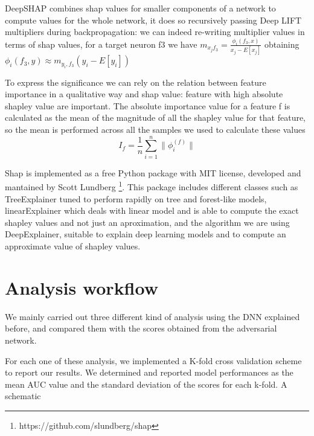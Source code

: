 \documentclass[10pt]{report}
\begin{document}
DeepSHAP combines shap values for smaller components of a network to compute values for the whole network, it does so recursively passing Deep LIFT multipliers during backpropagation: we can indeed re-writing multiplier values in terms of shap values, for a target neuron f3 we have $m_{x_j f_3} = \frac{\phi_i(f_3, x)}{x_j - E[x_j]}$ obtaining $\phi_i(f_3, y) \approx m_{y_i, f_3}(y_i - E[y_i])$


To express the significance we can rely on the relation between feature importance in a qualitative way and shap value: feature with high absolute shapley value are important.
The absolute importance value for a feature f is calculated as the mean of the magnitude of all the shapley value for that feature, so the mean is performed across all the samples we used to calculate these values
\begin{equation}\label{eq:shap_magnitude}
I_f = \frac{1}{n} \sum_{i = 1}^n \|\phi_i^{(f)}\|
\end{equation}

Shap is implemented as a free Python package with MIT license, developed and mantained by Scott Lundberg \footnote{https://github.com/slundberg/shap}.
This package includes different classes such as TreeExplainer tuned to perform rapidly on tree and forest-like models, linearExplainer which deals with linear model and is able to compute the exact shapley values and not just an aproximation, and the algorithm we are using DeepExplainer, suitable to explain deep learning models and to compute an approximate value of shapley values.


\newpage




\chapter{Analysis workflow}\label{sec:analysis_workflow}

We mainly carried out three different kind of analysis using the DNN explained before, and compared them with the scores obtained from the adversarial network.

For each one of these analysis, we implemented a K-fold cross validation scheme to report our results. We determined and reported model performances as the mean AUC value and the standard deviation of the scores for each k-fold. A schematic
\end{document}
